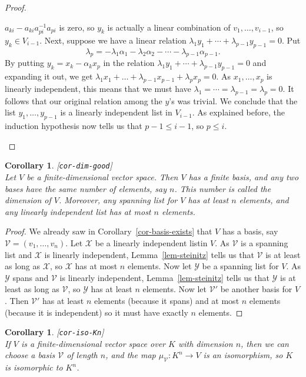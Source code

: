 \documentclass{amsart}
\newcommand{\lbl}[1]{\label{#1}\textup{[\texttt{#1}]}\ \\}
\newcommand{\lbl}{\label}
\newcommand{\al}        {\alpha}
\newcommand{\lm}        {\lambda}
\newcommand{\CV}        {{\mathcal{V}}}
\newcommand{\CX}        {{\mathcal{X}}}
\newcommand{\CY}        {{\mathcal{Y}}}
\renewcommand{\:}       {\colon}
\newtheorem{corollary}[theorem]{Corollary}
\theoremstyle{definition}
\begin{document}
\begin{proof}
\begin{itemize}
   $a_{ki}-a_{ki}a_{pi}^{-1}a_{pi}$ is zero, so $y_k$ is
   actually a linear combination of $v_1,\dotsc,v_{i-1}$, so
   $y_k\in V_{i-1}$.  Next, suppose we have a linear
   relation $\lm_1y_1+\dotsb+\lm_{p-1}y_{p-1}=0$.  Put 
   \[ \lm_p =
       -\lm_1\al_1-\lm_2\al_2-\dotsb -\lm_{p-1}\al_{p-1}.
   \] 
   By putting $y_k=x_k-\al_kx_p$ in the relation
   $\lm_1y_1+\dotsb+\lm_{p-1}y_{p-1}=0$ and expanding it
   out, we get
   $\lm_1x_1+\dotsc+\lm_{p-1}x_{p-1}+\lm_px_p=0$.  As
   $x_1,\dotsc,x_p$ is linearly independent, this means that
   we must have $\lm_1=\dotsb=\lm_{p-1}=\lm_p=0$.  It
   follows that our original relation among the $y$'s was
   trivial.  We conclude that the list $y_1,\dotsc,y_{p-1}$
   is a linearly independent list in $V_{i-1}$.  As
   explained before, the induction hypothesis now tells us
   that $p-1\leq i-1$, so $p\leq i$.
 \end{itemize}
\end{proof}

\begin{corollary}\lbl{cor-dim-good}
 Let $V$ be a finite-dimensional vector space.  Then $V$ has
 a finite basis, and any two bases have the same number of
 elements, say $n$.  This number is called the
 \emph{dimension} of $V$.  Moreover, any spanning list for
 $V$ has at least $n$ elements, and any linearly independent
 list has at most $n$ elements.
\end{corollary}
\begin{proof}
 We already saw in Corollary~\ref{cor-basis-exists} that $V$
 has a basis, say $\CV=(v_1,\dotsc,v_n)$.  Let $\CX$ be a
 linearly independent listin $V$.  As $\CV$ is a spanning
 list and $\CX$ is linearly independent,
 Lemma~\ref{lem-steinitz} tells us that $\CV$ is at least as
 long as $\CX$, so $\CX$ has at most $n$ elements.  Now let
 $\CY$ be a spanning list for $V$.  As $\CY$ spans and $\CV$
 is linearly independent, Lemma~\ref{lem-steinitz} tells us
 that $\CY$ is at least as long as $\CV$, so $\CY$ has at
 least $n$ elements.  Now let $\CV'$ be another basis for
 $V$.  Then $\CV'$ has at least $n$ elements (because it
 spans) and at most $n$ elements (because it is independent)
 so it must have exactly $n$ elements.  
\end{proof}

\begin{corollary}\lbl{cor-iso-Kn}
 If $V$ is a finite-dimensional vector space over $K$ with
 dimension $n$, then we can choose a basis $\CV$ of length $n$, and
 the map $\mu_\CV\:K^n\to V$ is an isomorphism, so $K$ is isomorphic
 to $K^n$.
\end{corollary}
\end{document}

